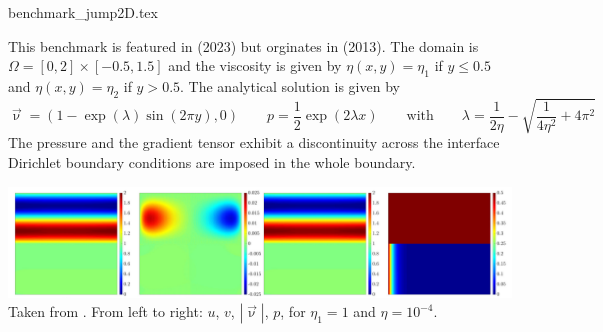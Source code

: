 \begin{flushright} {\tiny {\color{gray} benchmark\_jump2D.tex}} \end{flushright}

This benchmark is featured in \textcite{sedu23} (2023) 
but orginates in \textcite{wakh13} (2013).
The domain is $\Omega=[0,2]\times[-0.5,1.5]$ and the viscosity is 
given by $\eta(x,y)=\eta_1$ if $y\le 0.5$
and $\eta(x,y)=\eta_2$ if $y > 0.5$.
The analytical solution is given by
\begin{equation}
\vec\upnu=(1-\exp(\lambda)\sin(2\pi y) , 0) 
\qquad
p=\frac12 \exp(2\lambda x)
\qquad
\text{with}
\qquad
\lambda = \frac{1}{2\eta}-\sqrt{\frac{1}{4\eta^2}+4\pi^2}
\end{equation}
The pressure and the gradient tensor exhibit a discontinuity across the interface
Dirichlet boundary conditions are imposed in the whole boundary.

\begin{center}
\includegraphics[width=15cm]{images/mms/sedu23a}\\
{\captionfont Taken from \cite{sedu23}. From left to right: 
$u$, $v$, $|\vec\upnu|$, $p$, for $\eta_1=1$ and $\eta=10^{-4}.$}
\end{center}


